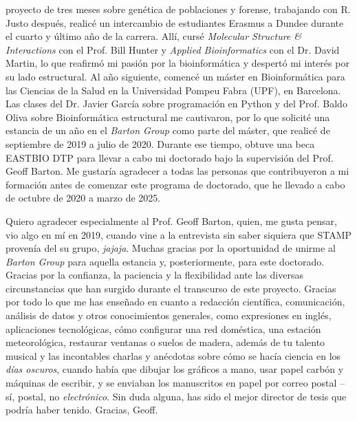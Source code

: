 proyecto de tres meses sobre genética de poblaciones y forense, trabajando con R. Justo después, realicé un intercambio de estudiantes Erasmus a Dundee durante el cuarto y último año de la carrera. Allí, cursé \textit{Molecular Structure \& Interactions} con el Prof. Bill Hunter y \textit{Applied Bioinformatics} con el Dr. David Martin, lo que reafirmó mi pasión por la bioinformática y despertó mi interés por su lado estructural. Al año siguiente, comencé un máster en Bioinformática para las Ciencias de la Salud en la Universidad Pompeu Fabra (UPF), en Barcelona. Las clases del Dr. Javier García sobre programación en Python y del Prof. Baldo Oliva sobre Bioinformática estructural me cautivaron, por lo que solicité una estancia de un año en el \textit{Barton Group} como parte del máster, que realicé de septiembre de 2019 a julio de 2020. Durante ese tiempo, obtuve una beca EASTBIO DTP para llevar a cabo mi doctorado bajo la supervisión del Prof. Geoff Barton. Me gustaría agradecer a todas las personas que contribuyeron a mi formación antes de comenzar este programa de doctorado, que he llevado a cabo de octubre de 2020 a marzo de 2025.

Quiero agradecer especialmente al Prof. Geoff Barton, quien, me gusta pensar, vio algo en mí en 2019, cuando vine a la entrevista sin saber siquiera que STAMP provenía del su grupo, \textit{jajaja}. Muchas gracias por la oportunidad de unirme al \textit{Barton Group} para aquella estancia y, posteriormente, para este doctorado. Gracias por la confianza, la paciencia y la flexibilidad ante las diversas circunstancias que han surgido durante el transcurso de este proyecto. Gracias por todo lo que me has enseñado en cuanto a redacción científica, comunicación, análisis de datos y otros conocimientos generales, como expresiones en inglés, aplicaciones tecnológicas, cómo configurar una red doméstica, una estación meteorológica, restaurar ventanas o suelos de madera, además de tu talento musical y las incontables charlas y anécdotas sobre cómo se hacía ciencia en los \textit{días oscuros}, cuando había que dibujar los gráficos a mano, usar papel carbón y máquinas de escribir, y se enviaban los manuscritos en papel por correo postal -- sí, postal, no \textit{electrónico}. Sin duda alguna, has sido el mejor director de tesis que podría haber tenido. Gracias, Geoff.

